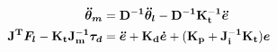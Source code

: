 \setlength{\arraycolsep}{0.0em}
\begin{align}
\label{JTFC2_error_equation1}
\vects{\ddot{\theta}_m} &= \vectm{D^{-1}} \vects{\ddot{\theta}_l} - \vectm{D^{-1}} \vectm{K_t^{-1}} \vects{\ddot{e}}
\\
\label{JTFC2_error_equation2}
\vectm{J^T} \vects{F_l} - \vectm{K_t} \vectm{J^{-1}_m} \vects{\tau_d}& = \vects{\ddot{e}} + \vectm{K_d} \vects{\dot{e}} + (\vectm{K_p} + \vectm{J^{-1}_i} \vectm{K_t}) \vects{e}
\end{align}
\setlength{\arraycolsep}{5pt}


%
%
%

%
